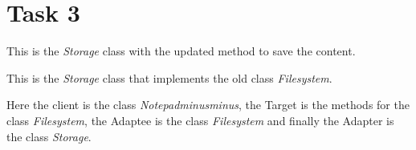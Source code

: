 \chapter{Task 3}
\begin{parlist}
	\item This is the \textit{Storage} class with the updated method to save the content.

This is the \textit{Storage} class that implements the old class \textit{Filesystem}.

	\item Here the client is the class \textit{Notepadminusminus}, the Target is the methods for the class \textit{Filesystem}, the Adaptee is the class \textit{Filesystem} and finally the Adapter is the class \textit{Storage}. 
\end{parlist}
